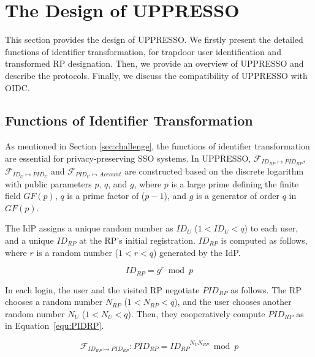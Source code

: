 \section{The Design of UPPRESSO}
\label{sec:UPPRESSO}
This section provides the design of UPPRESSO.
We firstly present the detailed functions of identifier transformation, for trapdoor user identification and transformed RP designation.
Then, we provide an overview of UPPRESSO and describe the protocols.
Finally, we discuss the compatibility of UPPRESSO with OIDC.

\subsection{Functions of Identifier Transformation}
\label{subsec:overview}
As mentioned in Section \ref{sec:challenge},
the functions of identifier transformation
 are essential for privacy-preserving SSO systems.
In UPPRESSO,
$\mathcal{F}_{ID_{RP} \mapsto PID_{RP}}$, $\mathcal{F}_{ID_{U} \mapsto PID_{U}}$ and $\mathcal{F}_{PID_{U} \mapsto Account}$
    are constructed based on the discrete logarithm with public parameters $p$, $q$, and $g$, %
 where  $p$ is a large prime defining the finite field $GF(p)$,
  $q$ is a prime factor of ($p-1$), and $g$ is a generator of order $q$ in $GF(p)$.

The IdP assigns a  unique random number as  $ID_U$ ($1 < ID_U <q $) to each user,
 and a unique $ID_{RP}$ at the RP's initial registration.
$ID_{RP}$ is computed as follows, where $r$ is a random number ($1 < r < q$) generated by the IdP.

\begin{equation}
    ID_{RP} = g^{r} \bmod p
   \label{equ:IDRP}
\end{equation}


In each login,
 the user and the visited RP negotiate $PID_{RP}$ as follows.
The RP chooses a random number $N_{RP}$ ($1 < N_{RP}<q $), and the user chooses another random number $N_{U}$ ($1 < N_{U}<q $).
Then, they cooperatively compute $PID_{RP}$ as in Equation~\ref{equ:PIDRP}.

\begin{equation}
    \mathcal{F}_{ID_{RP} \mapsto PID_{RP}}: PID_{RP} = {ID_{RP}}^{N_{U} N_{RP}} \bmod p
   \label{equ:PIDRP}
   \end{equation}


